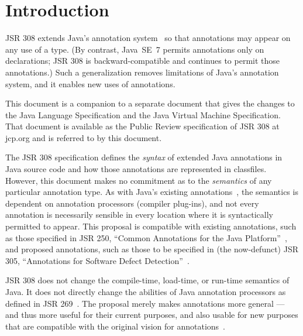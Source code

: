 \documentclass[10pt]{article}
\begin{document}


\tableofcontents

\section{Introduction\label{intro}}

JSR 308 extends Java's annotation system~\cite{JSR175} so that
annotations may appear on any use of a type.
(By contrast, Java~SE~7 permits annotations only on
declarations; JSR 308 is
backward-compatible and continues to permit those annotations.)
Such a generalization removes
limitations of Java's annotation
system, and it enables new uses of annotations.

This document is a companion to a separate document that gives the changes
to the Java Language Specification and the Java Virtual Machine
Specification.  That document is available as
the Public Review specification of JSR 308 at jcp.org
and
is referred to by this document.

The JSR 308 specification defines the \emph{syntax} of extended Java annotations in
Java source code and how those annotations are represented in classfiles.
However, this document makes no commitment as to the \emph{semantics} of any
particular annotation type.  As with Java's
existing annotations~\cite{JSR175}, the semantics is dependent on annotation processors
(compiler plug-ins), and not every annotation is necessarily sensible in
every location where it is syntactically permitted to appear.
This proposal is compatible with existing annotations,
such as those specified in JSR 250, ``Common Annotations for the Java
Platform''~\cite{JSR250}, and proposed annotations, such as those to be
specified in (the now-defunct) JSR 305, ``Annotations for Software Defect
Detection''~\cite{JSR305}.

JSR 308 does not change the compile-time, load-time, or run-time
semantics of Java.  It does not directly change the abilities of Java annotation
processors as defined in JSR 269~\cite{JSR269}.
The proposal merely makes annotations more general --- and thus more useful
for their current purposes, and also usable for new purposes that are
compatible with the original vision for annotations~\cite{JSR175}.
\end{document}
